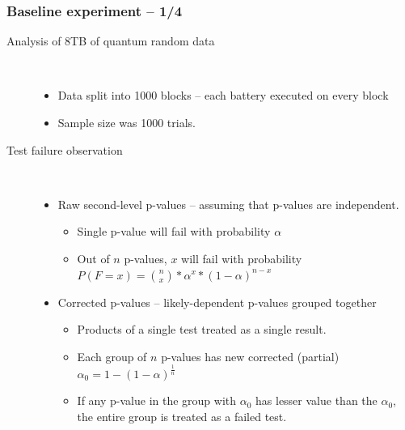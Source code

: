 \documentclass[aspectratio=169]{beamer}
\begin{document}
\begin{frame}
\frametitle{Baseline experiment -- 1/4}

\begin{description}
\item[Analysis of 8TB of quantum random data] \hfill \\
\begin{itemize}
\item Data split into 1000 blocks -- each battery executed on every block
\item Sample size was 1000 trials.
\end{itemize}
\vspace{.2cm}
\item[Test failure observation] \hfill \\
\begin{itemize}
\item Raw second-level p-values -- assuming that p-values are independent.
\begin{itemize}
\item Single p-value will fail with probability $\alpha$
\item Out of $n$ p-values, $x$ will fail with probability $P(F=x) = { n \choose x } * \alpha^x * (1-\alpha)^{n-x}$
\end{itemize}
\item Corrected p-values -- likely-dependent p-values grouped together
\begin{itemize}
\item Products of a single test treated as a single result.
\item Each group of $n$ p-values has new corrected (partial) $\alpha_0 = 1 - (1 - \alpha)^{\frac{1}{n}}$
\item If any p-value in the group with $\alpha_0$ has lesser value than the $\alpha_0$, the entire group is treated as a failed test.
\end{itemize}
\end{itemize}
\end{description}

\end{frame}
\end{document}
